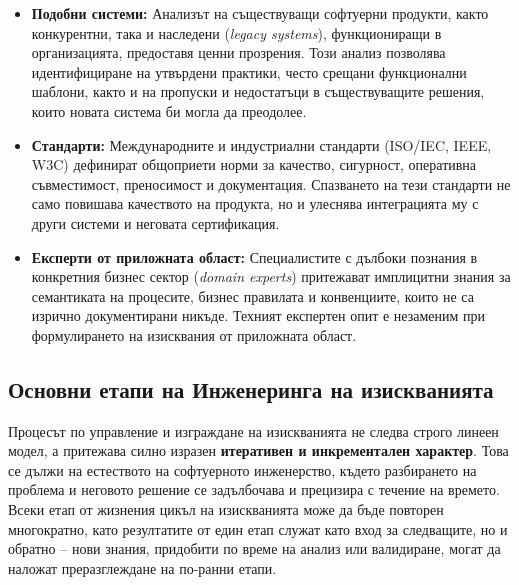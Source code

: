 \documentclass{scrartcl}
\begin{document}
\begin{FlushLeft}
\begin{itemize}
    \item \textbf{Подобни системи:} Анализът на съществуващи софтуерни продукти, както конкурентни, така и наследени (\textit{legacy systems}), функциониращи в организацията, предоставя ценни прозрения. Този анализ позволява идентифициране на утвърдени практики, често срещани функционални шаблони, както и на пропуски и недостатъци в съществуващите решения, които новата система би могла да преодолее.
    
    \item \textbf{Стандарти:} Международните и индустриални стандарти (ISO/IEC, IEEE, W3C) дефинират общоприети норми за качество, сигурност, оперативна съвместимост, преносимост и документация. Спазването на тези стандарти не само повишава качеството на продукта, но и улеснява интеграцията му с други системи и неговата сертификация.
    
    \item \textbf{Експерти от приложната област:} Специалистите с дълбоки познания в конкретния бизнес сектор (\textit{domain experts}) притежават имплицитни знания за семантиката на процесите, бизнес правилата и конвенциите, които не са изрично документирани никъде. Техният експертен опит е незаменим при формулирането на изисквания от приложната област.
\end{itemize}

\subsection{Основни етапи на Инженеринга на изискванията}

Процесът по управление и изграждане на изискванията не следва строго линеен модел, а притежава силно изразен \textbf{итеративен и инкрементален характер}. Това се дължи на естеството на софтуерното инженерство, където разбирането на проблема и неговото решение се задълбочава и прецизира с течение на времето. Всеки етап от жизнения цикъл на изискванията може да бъде повторен многократно, като резултатите от един етап служат като вход за следващите, но и обратно -- нови знания, придобити по време на анализ или валидиране, могат да наложат преразглеждане на по-ранни етапи.


\end{FlushLeft}
\end{document}
